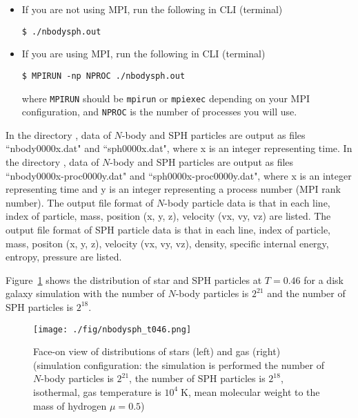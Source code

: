 \label{s3sec:NbodySPH_execution}
\begin{itemize}
\item If you are not using MPI, run the following in CLI (terminal)
\begin{screen}
\begin{verbatim}
$ ./nbodysph.out
\end{verbatim}
\end{screen}
  
\item If you are using MPI, run the following in CLI (terminal)
\begin{screen}
\begin{verbatim}
$ MPIRUN -np NPROC ./nbodysph.out
\end{verbatim}
\end{screen}
where \texttt{MPIRUN} should be \texttt{mpirun} or \texttt{mpiexec} depending on your MPI configuration, and \texttt{NPROC} is the number of processes you will use.
\end{itemize}

\label{s3sec:NbodySPH_result_analysis}
\ifCpp %
In the directory , data of $N$-body and SPH particles are output as files ``nbody0000x.dat" and ``sph0000x.dat", where x is an integer representing time.
\endifCpp
\ifIF %
In the directory , data of $N$-body and SPH particles are output as files ``nbody0000x-proc0000y.dat" and ``sph0000x-proc0000y.dat", where x is an integer representing time and y is an integer representing a process number (MPI rank number).
\endifIF
The output file format of $N$-body particle data is that in each line, index of particle, mass, position (x, y, z), velocity (vx, vy, vz) are listed. The output file format of SPH particle data is that in each line, index of particle, mass, positon (x, y, z), velocity (vx, vy, vz), density, specific internal energy, entropy, pressure are listed.

Figure~\ref{fig:nbodysph} shows the distribution of star and SPH particles at $T=0.46$ for a disk galaxy simulation with the number of $N$-body particles is $2^{21}$ and the number of SPH particles is $2^{18}$.

\begin{figure}[h]
\centering
\texttt{[image: ./fig/nbodysph\_t046.png]}
\caption{Face-on view of distributions of stars (left) and gas (right) (simulation configuration: the simulation is performed the number of $N$-body particles is $2^{21}$, the number of SPH particles is $2^{18}$, isothermal, gas temperature is $10^{4}\;\mathrm{K}$, mean molecular weight to the mass of hydrogen $\mu=0.5$)}
\label{fig:nbodysph}
\end{figure}


